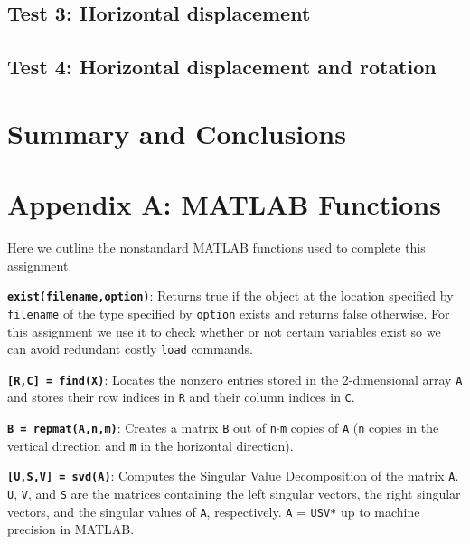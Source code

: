 \documentclass[fleqn,10pt]{../SelfArx} %
\begin{document}
\subsection{Test 3: Horizontal displacement}

\subsection{Test 4: Horizontal displacement and rotation}



\section{Summary and Conclusions} %
\label{sec:summary_and_conclusions}






\section*{Appendix A: MATLAB Functions} %
Here we outline the nonstandard MATLAB functions used to complete this assignment.
\vskip 0.5cm

\noindent \texttt{\textbf{exist(filename,option)}}: Returns true if the object at the location specified by \texttt{filename} of the type specified by \texttt{option} exists and returns false otherwise. For this assignment we use it to check whether or not certain variables exist so we can avoid redundant costly \texttt{load} commands.
\vskip 0.3cm

\noindent \texttt{\textbf{[R,C] = find(X)}}: Locates the nonzero entries stored in the 2-dimensional array \texttt{A} and stores their row indices in \texttt{R} and their column indices in \texttt{C}.
\vskip 0.3cm

\noindent \texttt{\textbf{B = repmat(A,n,m)}}: Creates a matrix \texttt{B} out of \texttt{n}$\cdot$\texttt{m} copies of \texttt{A} (\texttt{n} copies in the vertical direction and \texttt{m} in the horizontal direction).
\vskip 0.3cm

\noindent \texttt{\textbf{[U,S,V] = svd(A)}}: Computes the Singular Value Decomposition of the matrix \texttt{A}. \texttt{U}, \texttt{V}, and \texttt{S} are the matrices containing the left singular vectors, the right singular vectors, and the singular values of \texttt{A}, respectively. \texttt{A} = \texttt{USV*} up to machine precision in MATLAB.
\vskip 0.3cm
\end{document}
